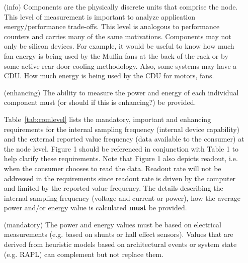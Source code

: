 \begin{itemize}

\item[(info)]
Components are the physically discrete units that comprise the node. This level of measurement is important to analyze application energy/performance trade-offs. This level is analogous to performance counters and carries many of the same motivations.  Components may not only be silicon devices.  For example, it would be useful to know how much fan energy is being used by the Muffin fans at the back of the rack or by some active rear door cooling methodology.  Also, some systems may have a CDU.  How much energy is being used by the CDU for motors, fans.
	
\item[(enhancing)]
The ability to measure the power and energy of each individual component must (or should if this is enhancing?) be provided.
	
	Table~\ref{tab:comlevel}  lists the mandatory, important and enhancing requirements for the internal sampling frequency (internal device capability) and the external reported value frequency (data available to the consumer) at the node level. Figure 1 should be referenced in conjunction with Table 1 to help clarify these requirements. Note that Figure 1 also depicts readout, i.e. when the consumer chooses to read the data. Readout rate will not be addressed in the requirements since readout rate is driven by the computer and limited by the reported value frequency. The details describing the internal sampling frequency (voltage and current or power), how the average power and/or energy value is calculated \textbf{must} be provided.

\item[(mandatory)]
The power and energy values must be based on electrical measurements (e.g. based on shunts or hall effect sensors). Values that are derived from heuristic models based on architectural events or system state (e.g. RAPL) can complement but not replace them.
\end{itemize}



